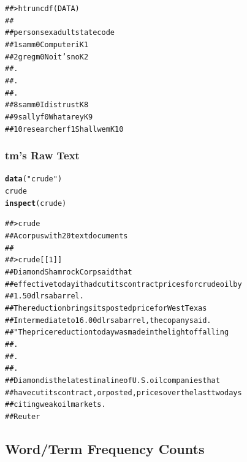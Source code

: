 \documentclass{article}\usepackage[]{graphicx}\usepackage[]{color}
\makeatletter
\newcommand{\hlstr}[1]{\textcolor[rgb]{0.192,0.494,0.8}{#1}}%
\newcommand{\hlstd}[1]{\textcolor[rgb]{0.345,0.345,0.345}{#1}}%
\newcommand{\hlkwd}[1]{\textcolor[rgb]{0.737,0.353,0.396}{\textbf{#1}}}%
\newenvironment{kframe}{%
 \def\at@end@of@kframe{}%
 \ifinner\ifhmode%
  \def\at@end@of@kframe{\end{minipage}}%
  \begin{minipage}{\columnwidth}%
 \fi\fi%
 \def\FrameCommand##1{\hskip\@totalleftmargin \hskip-\fboxsep
 \colorbox{shadecolor}{##1}\hskip-\fboxsep
     \hskip-\linewidth \hskip-\@totalleftmargin \hskip\columnwidth}%
 \MakeFramed {\advance\hsize-\width
   \@totalleftmargin\z@ \linewidth\hsize
   \@setminipage}}%
 {\par\unskip\endMakeFramed%
 \at@end@of@kframe}
\newenvironment{knitrout}{}{} %
\makeatother
\begin{document}
\begin{knitrout}
\color{fgcolor}\begin{kframe}
\begin{alltt}
## > htruncdf(DATA)
##
##        person sex adult      state code
## 1         sam   m     0 Computer i   K1
## 2        greg   m     0 No it's no   K2
## .
## .
## .
## 8         sam   m     0 I distrust   K8
## 9       sally   f     0 What are y   K9
## 10 researcher   f     1 Shall we m  K10
\end{alltt}
\end{kframe}
\end{knitrout}

\subsubsection{tm's Raw Text}
\begin{knitrout}
\color{fgcolor}\begin{kframe}
\begin{alltt}
\hlkwd{data}\hlstd{(}\hlstr{"crude"}\hlstd{)}
\hlstd{crude}
\hlkwd{inspect}\hlstd{(crude)}
\end{alltt}
\end{kframe}
\end{knitrout}


\begin{knitrout}
\color{fgcolor}\begin{kframe}
\begin{alltt}
## > crude
## A corpus with 20 text documents
## 
## > crude[[1]]
## Diamond Shamrock Corp said that
## effective today it had cut its contract prices for crude oil by
## 1.50 dlrs a barrel.
##     The reduction brings its posted price for West Texas
## Intermediate to 16.00 dlrs a barrel, the copany said.
##     "The price reduction today was made in the light of falling
## .
## .
## .
##     Diamond is the latest in a line of U.S. oil companies that
## have cut its contract, or posted, prices over the last two days
## citing weak oil markets.
##  Reuter
\end{alltt}
\end{kframe}
\end{knitrout}

\subsection{Word/Term Frequency Counts}
\end{document}

